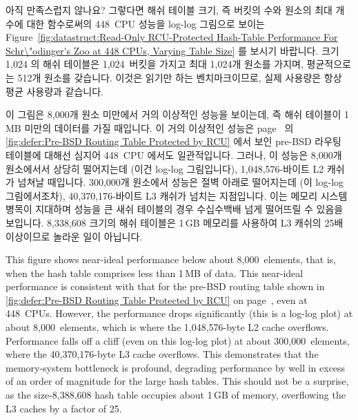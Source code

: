 {	아직 만족스럽지 않나요?
	그렇다면 해쉬 테이블 크기, 즉 버킷의 수와 원소의 최대 개수에 대한
	함수로써의 448~CPU 성능을 log-log 그림으로 보이는
	Figure~\ref{fig:datastruct:Read-Only RCU-Protected Hash-Table Performance For Schr\"odinger's Zoo at 448 CPUs, Varying Table Size}
	를 보시기 바랍니다.
	크기 1,024 의 해쉬 테이블은 1,024~버킷을 가지고 최대 1,024개 원소를
	가지며, 평균적으로는 512개 원소를 갖습니다.
	이것은 읽기만 하는 벤치마크이므로, 실제 사용량은 항상 평균 사용량과
	같습니다.

	이 그림은 8,000개 원소 미만에서 거의 이상적인 성능을 보이는데, 즉 해쉬
	테이블이 1\,MB 미만의 데이터를 가질 때입니다.
	이 거의 이상적인 성능은
	page~\pageref{fig:defer:Pre-BSD Routing Table Protected by RCU} 의
	\cref{fig:defer:Pre-BSD Routing Table Protected by RCU}
	에서 보인 pre-BSD 라우팅 테이블에 대해선 심지어 448~CPU 에서도
	일관적입니다.
	그러나, 이 성능은 8,000개 원소에서서 상당히 떨어지는데 (이건 log-log
	그림입니다), 1,048,576-바이트 L2 캐쉬가 넘쳐날 때입니다.
	300,000개 원소에서 성능은 절벽 아래로 떨어지는데 (이 log-log
	그림에서조차), 40,370,176-바이트 L3 캐쉬가 넘치는 지점입니다.
	이는 메모리 시스템 병목이 지대하며 성능을 큰 새쉬 테이블의 경우
	수십수백배 넘게 떨어뜨릴 수 있음을 보입니다.
	8,338,608 크기의 해쉬 테이블은 1\,GB 메모리를 사용하여 L3 캐쉬의 25배
	이상이므로 놀라운 일이 아닙니다.

	\iffalse

	This figure shows near-ideal performance below about 8,000~elements,
	that is, when the hash table comprises less than 1\,MB of data.
	This near-ideal performance is consistent with that for the
	pre-BSD routing table shown in
	\cref{fig:defer:Pre-BSD Routing Table Protected by RCU}
	on page~\pageref{fig:defer:Pre-BSD Routing Table Protected by RCU},
	even at 448~CPUs.
	However, the performance drops significantly (this is a log-log
	plot) at about 8,000~elements, which is where the 1,048,576-byte
	L2 cache overflows.
	Performance falls off a cliff (even on this log-log plot) at about
	300,000~elements, where the 40,370,176-byte L3 cache overflows.
	This demonstrates that the memory-system bottleneck is profound,
	degrading performance by well in excess of an order of magnitude
	for the large hash tables.
	This should not be a surprise, as the size-8,388,608 hash table
	occupies about 1\,GB of memory, overflowing the L3 caches by
	a factor of 25.

}
